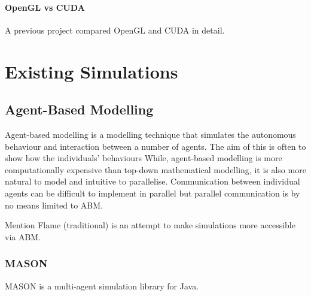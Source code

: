 \documentclass{UoYCSproject}
\begin{document}


\paragraph{OpenGL vs CUDA}
A previous project compared OpenGL and CUDA in detail.

\section{Existing Simulations}

\subsection{Agent-Based Modelling}
\label{abm}
Agent-based modelling is a modelling technique that simulates the autonomous behaviour and interaction between a number of agents. The aim of this is often to show how the individuals' behaviours 
While, agent-based modelling is more computationally expensive than top-down mathematical modelling, it is also more natural to model and intuitive to parallelise\cite{flame_simulation}.
Communication between individual agents can be difficult to implement in parallel but parallel communication is by no means limited to ABM.


Mention Flame (traditional) is an attempt to make simulations more accessible via ABM.


\subsubsection{MASON}
MASON is a multi-agent simulation library for Java.
\end{document}
